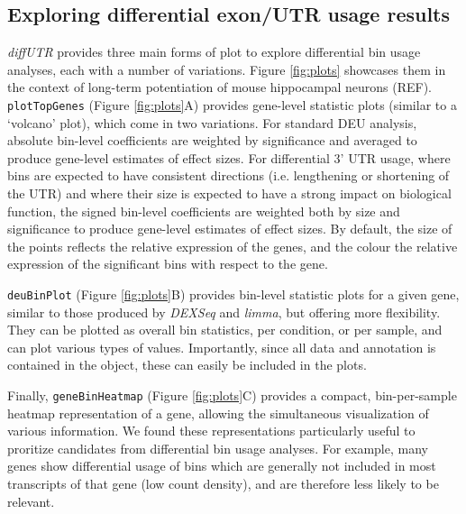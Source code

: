 \documentclass{bmcart}
\begin{document}
\subsection*{Exploring differential exon/UTR usage results}

\textit{diffUTR} provides three main forms of plot to explore differential bin usage analyses, each with a number of variations. Figure \ref{fig:plots} showcases them in the context of long-term potentiation of mouse hippocampal neurons (REF). \texttt{plotTopGenes} (Figure \ref{fig:plots}A) provides gene-level statistic plots (similar to a `volcano' plot), which come in two variations. For standard DEU analysis, absolute bin-level coefficients are weighted by significance and averaged to produce gene-level estimates of effect sizes. For differential 3' UTR usage, where bins are expected to have consistent directions (i.e. lengthening or shortening of the UTR) and where their size is expected to have a strong impact on biological function, the signed bin-level coefficients are weighted both by size and significance to produce gene-level estimates of effect sizes. By default, the size of the points reflects the relative expression of the genes, and the colour the relative expression of the significant bins with respect to the gene.

\texttt{deuBinPlot} (Figure \ref{fig:plots}B) provides bin-level statistic plots for a given gene, similar to those produced by \textit{DEXSeq} and \textit{limma}, but offering more flexibility. They can be plotted as overall bin statistics, per condition, or per sample, and can plot various types of values. Importantly, since all data and annotation is contained in the object, these can easily be included in the plots.

Finally, \texttt{geneBinHeatmap} (Figure \ref{fig:plots}C) provides a compact, bin-per-sample heatmap representation of a gene, allowing the simultaneous visualization of various information. We found these representations particularly useful to proritize candidates from differential bin usage analyses. For example, many genes show differential usage of bins which are generally not included in most transcripts of that gene (low count density), and are therefore less likely to be relevant. 
\end{document}

